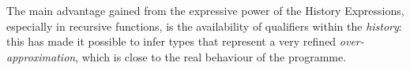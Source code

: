 The main advantage gained from the expressive power of the History Expressions, especially in recursive functions, is the availability of qualifiers within the \emph{history}: this has made it possible to infer types that represent a very refined \emph{over-approximation}, which is close to the real behaviour of the programme.
